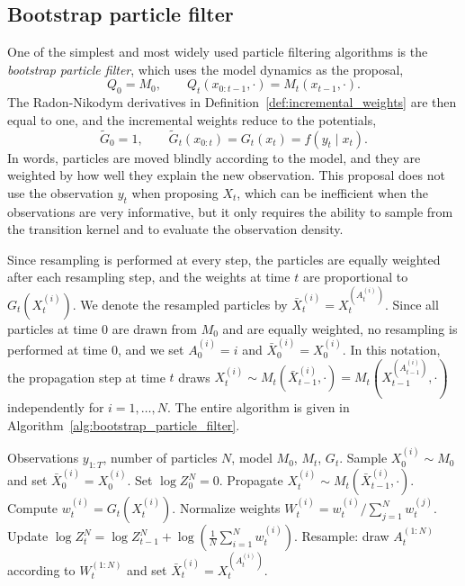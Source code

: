 \subsection{Bootstrap particle filter}
\label{sec:bootstrap_particle_filter}
One of the simplest and most widely used particle filtering algorithms is the \emph{bootstrap particle filter}, which uses the model dynamics as the proposal,
\begin{equation}
    Q_0 = M_0, \qquad Q_t(x_{0:t-1},\cdot) = M_t(x_{t-1},\cdot).
\end{equation}
The Radon-Nikodym derivatives in Definition~\ref{def:incremental_weights} are then equal to one, and the incremental weights reduce to the potentials,
\begin{equation}
    \tilde{G}_0 = 1, \qquad \tilde{G}_t(x_{0:t}) = G_t(x_t) = f(y_t\mid x_t).
\end{equation}
In words, particles are moved blindly according to the model, and they are weighted by how well they explain the new observation. This proposal does not use the observation $y_t$ when proposing $X_t$, which can be inefficient when the observations are very informative, but it only requires the ability to sample from the transition kernel and to evaluate the observation density.

Since resampling is performed at every step, the particles are equally weighted after each resampling step, and the weights at time $t$ are proportional to $G_t(X_t^{(i)})$. We denote the resampled particles by $\bar{X}_t^{(i)} = X_t^{(A_t^{(i)})}$. Since all particles at time $0$ are drawn from $M_0$ and are equally weighted, no resampling is performed at time $0$, and we set $A_0^{(i)} = i$ and $\bar{X}_0^{(i)} = X_0^{(i)}$. In this notation, the propagation step at time $t$ draws $X_t^{(i)}\sim M_t(\bar{X}_{t-1}^{(i)},\cdot) = M_t(X_{t-1}^{(A_{t-1}^{(i)})},\cdot)$ independently for $i=1,\ldots,N$. The entire algorithm is given in Algorithm~\ref{alg:bootstrap_particle_filter}.

\begin{algorithm}[H]
\caption{Bootstrap particle filter}
\label{alg:bootstrap_particle_filter}
\begin{algorithmic}[1]
    \REQUIRE Observations $y_{1:T}$, number of particles $N$, model $M_0$, $M_t$, $G_t$.
        \STATE Sample $X_0^{(i)}\sim M_0$ and set $\bar{X}_0^{(i)} = X_0^{(i)}$.
    \ENDFOR
    \STATE Set $\log Z_0^N = 0$.
            \STATE Propagate $X_t^{(i)}\sim M_t(\bar{X}_{t-1}^{(i)},\cdot)$.
            \STATE Compute $w_t^{(i)} = G_t(X_t^{(i)})$.
        \ENDFOR
        \STATE Normalize weights $W_t^{(i)} = w_t^{(i)}/\sum_{j=1}^{N}w_t^{(j)}$.
        \STATE Update $\log Z_t^N = \log Z_{t-1}^N + \log\left(\frac{1}{N}\sum_{i=1}^{N}w_t^{(i)}\right)$.
        \STATE Resample: draw $A_t^{(1:N)}$ according to $W_t^{(1:N)}$ and set $\bar{X}_t^{(i)} = X_t^{(A_t^{(i)})}$.
    \ENDFOR
\end{algorithmic}
\end{algorithm}

